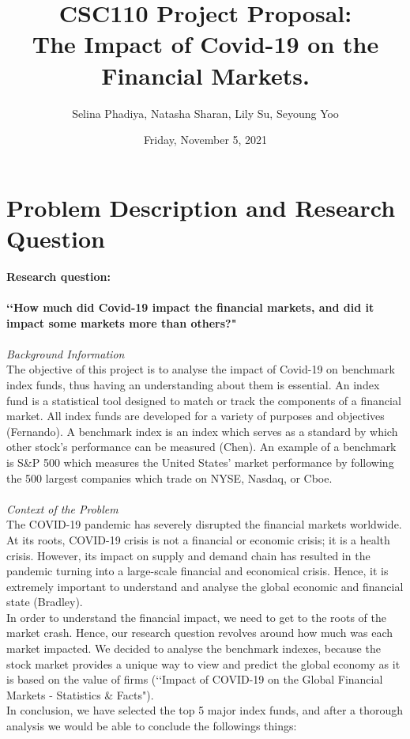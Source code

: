 \documentclass[fontsize=11pt]{article}
\title{
CSC110 Project Proposal:  \\
The Impact of Covid-19 on the Financial Markets.
}
\author{Selina Phadiya, Natasha Sharan, Lily Su, Seyoung Yoo}
\date{Friday, November 5, 2021}
\begin{document}
\maketitle

\section*{Problem Description and Research Question}
\textbf{Research question: \\
\\
\lq\lq How much did Covid-19 impact the financial markets, and did it impact some markets more than others?"} \\\\
\emph{Background Information} \\
The objective of this project is to analyse the impact of Covid-19 on benchmark index funds, thus having an understanding about them is essential.
An index fund is a statistical tool designed to match or track the components of a financial market.
All index funds are developed for a variety of purposes and objectives (Fernando). A benchmark index is an index which serves as a standard by which other stock’s performance can be measured (Chen). An example of a benchmark is S\&P 500 which measures the United States’ market performance by following the 500 largest companies which trade on NYSE, Nasdaq, or Cboe. \\ \\
\emph{Context of the Problem} \\
The COVID-19 pandemic has severely disrupted the financial markets worldwide. At its roots, COVID-19 crisis is not a financial or economic crisis; it is a health crisis. However, its impact on supply and demand chain has resulted in the pandemic turning into a large-scale financial and economical crisis. Hence, it is extremely important to understand and analyse the global economic and financial state (Bradley).\\
In order to understand the financial impact, we need to get to the roots of the market crash. Hence, our research question revolves around how much was each market impacted. We decided to analyse the benchmark indexes, because the stock market provides a unique way to view and predict the global economy as it is based on the value of firms (\lq\lq Impact of COVID-19 on the Global Financial Markets - Statistics \& Facts").\\
In conclusion, we have selected the top 5 major index funds, and after a thorough analysis we would be able to conclude the followings things:
\end{document}
